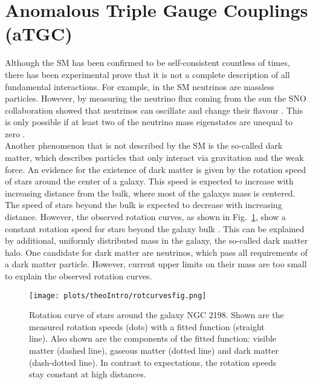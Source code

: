 \section{Anomalous Triple Gauge Couplings (aTGC)}
\label{sec:aTGC}

Although the SM has been confirmed to be self-consistent countless of times, there has been experimental prove that it is not a complete description of all fundamental interactions. For example, in the SM neutrinos are massless particles. However, by measuring the neutrino flux coming from the sun the SNO collaboration showed that neutrinos can oscillate and change their flavour \cite{SNO}. This is only possible if at least two of the neutrino mass eigenstates are unequal to zero \cite{}.\\
Another phenomenon that is not described by the SM is the so-called dark matter, which describes particles that only interact via gravitation and the weak force. An evidence for the existence of dark matter is given by the rotation speed of stars around the center of a galaxy. This speed is expected to increase with increasing distance from the bulk, where most of the galaxys mass is centered. The speed of stars beyond the bulk is expected to decrease with increasing distance. However, the observed rotation curves, as shown in Fig.~\ref{fig:theo:rotcurves}, show a constant rotation speed for stars beyond the galaxy bulk \cite{rotcurves}. This can be explained by additional, uniformly distributed mass in the galaxy, the so-called dark matter halo. One candidate for dark matter are neutrinos, which pass all requirements of a dark matter particle. However, current upper limits on their mass are too small to explain the observed rotation curves.
\begin{figure}
	\centering
	\texttt{[image: plots/theoIntro/rotcurvesfig.png]}
	\caption[Rotation curve of stars around the galaxy NGC 2198.]{Rotation curve of stars around the galaxy NGC 2198. Shown are the measured rotation speeds (dots) with a fitted function (straight line). Also shown are the components of the fitted function: visible matter (dashed line), gaseous matter (dotted line) and dark matter (dash-dotted line). In contrast to expectations, the rotation speeds stay constant at high distances.}
	\label{fig:theo:rotcurves}
\end{figure}

